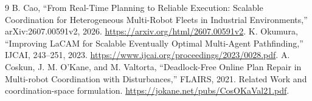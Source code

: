 \documentclass[11pt,a4paper]{article}
\begin{document}
\begin{thebibliography}{9}\small
{} B. Cao, ``From Real-Time Planning to Reliable Execution:
Scalable Coordination for Heterogeneous Multi-Robot Fleets in Industrial
Environments,'' arXiv:2607.00591v2, 2026.
\url{https://arxiv.org/html/2607.00591v2}.
 K. Okumura, ``Improving LaCAM for Scalable Eventually Optimal
Multi-Agent Pathfinding,'' IJCAI, 243--251, 2023.
\url{https://www.ijcai.org/proceedings/2023/0028.pdf}.
 A. Coskun, J. M. O'Kane, and M. Valtorta, ``Deadlock-Free
Online Plan Repair in Multi-robot Coordination with Disturbances,'' FLAIRS,
2021. Related Work and coordination-space formulation.
\url{https://jokane.net/pubs/CosOKaVal21.pdf}.
\end{thebibliography}
\end{document}
